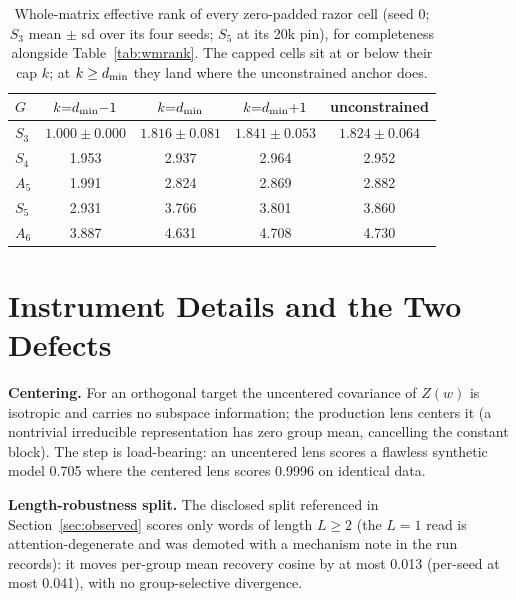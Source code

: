 \begin{table}[H]
\centering
\small
\begin{tabular}{lcccc}
\toprule
$G$ & $k{=}d_{\min}{-}1$ & $k{=}d_{\min}$ & $k{=}d_{\min}{+}1$ & unconstrained \\
\midrule
$S_3$ & $1.000 \pm 0.000$ & $1.816 \pm 0.081$ & $1.841 \pm 0.053$ & $1.824 \pm 0.064$ \\
$S_4$ & 1.953 & 2.937 & 2.964 & 2.952 \\
$A_5$ & 1.991 & 2.824 & 2.869 & 2.882 \\
$S_5$ & 2.931 & 3.766 & 3.801 & 3.860 \\
$A_6$ & 3.887 & 4.631 & 4.708 & 4.730 \\
\bottomrule
\end{tabular}
\caption{Whole-matrix effective rank of every zero-padded razor cell
(seed 0; $S_3$ mean $\pm$ sd over its four seeds; $S_5$ at its 20k
pin), for completeness alongside Table~\ref{tab:wmrank}. The capped cells sit at or below their
cap $k$; at $k \geq d_{\min}$ they land where the unconstrained anchor does.}
\label{tab:wmrank_cells}
\end{table}

\section{Instrument Details and the Two Defects}
\label{app:instrument}

\textbf{Centering.} For an orthogonal target the uncentered covariance
of $Z(w)$ is isotropic and carries no subspace information; the
production lens centers it (a nontrivial irreducible representation has
zero group mean, cancelling the constant block). The step is
load-bearing: an uncentered lens scores a flawless synthetic model 0.705
where the centered lens scores 0.9996 on identical data.

\textbf{Length-robustness split.} The disclosed split referenced in
Section~\ref{sec:observed} scores only words of length $L \geq 2$
(the $L = 1$ read is attention-degenerate and was demoted with a
mechanism note in the run records): it moves per-group mean recovery
cosine by at most 0.013 (per-seed at most 0.041), with no
group-selective divergence.

